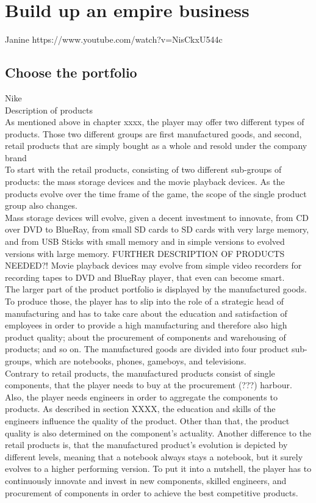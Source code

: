 \documentclass[11pt,titlepage,oneside,openany]{book}
\begin{document}
\section{Build up an empire business}
Janine
\label{sec:business}
https://www.youtube.com/watch?v=NisCkxU544c
\subsection{Choose the portfolio}
Nike \\
Description of products \\
As mentioned above in chapter xxxx, the player may offer two different types of products. Those two different groups are first manufactured goods, and second, retail products that are simply bought as a whole and resold under the company brand \\

To start with the retail products, consisting of two different sub-groups of products: the mass storage devices and the movie playback devices. As the products evolve over the time frame of the game, the scope of the single product group also changes. \\
Mass storage devices will evolve, given a decent investment to innovate, from CD over DVD to BlueRay, from small SD cards to SD cards with very large memory, and from USB Sticks with small memory and in simple versions to evolved versions with large memory. FURTHER DESCRIPTION OF PRODUCTS NEEDED?!
Movie playback devices may evolve from simple video recorders for recording tapes to DVD and BlueRay player, that even can become smart. \\

The larger part of the product portfolio is displayed by the manufactured goods. To produce those, the player has to slip into the role of a strategic head of manufacturing and has to take care about the education and satisfaction of employees in order to provide a high manufacturing and therefore also high product quality; about the procurement of components and warehousing of products; and so on.
The manufactured goods are divided into four product sub-groups, which are notebooks, phones, gameboys, and televisions. \\
Contrary to retail products, the manufactured products consist of single components, that the player needs to buy at the procurement (???) harbour. Also, the player needs engineers in order to aggregate the components to products. As described in section XXXX, the education and skills of the engineers influence the quality of the product. Other than that, the product quality is also determined on the component's actuality. Another difference to the retail products is, that the manufactured product's evolution is depicted by different levels, meaning that a notebook always stays a notebook, but it surely evolves to a higher performing version. To put it into a nutshell, the player has to continuously innovate and invest in new components, skilled engineers, and procurement of components in order to achieve the best competitive products. \\
\end{document}
